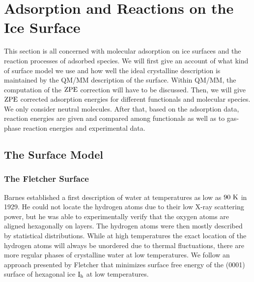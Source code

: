 \section{Adsorption and Reactions on the Ice Surface}
\label{Sec:Ads}

This section is all concerned with molecular adsorption on ice surfaces
and the reaction processes of adsorbed species. We will first give an
account of what kind of surface model we use and how well the ideal
crystalline description is maintained by the QM/MM description of
the surface. Within QM/MM, the computation of the $\text{ZPE}$ correction 
will have to be discussed. Then, we will give $\text{ZPE}$ corrected adsorption
energies for different functionals and molecular species. We only consider
neutral molecules.
After that, based on the adsorption data, reaction energies are given
and compared among functionals as well as to gas-phase reaction
energies and experimental data.

\subsection{The Surface Model}
\label{Sec:Ads:Model}

\subsubsection{The Fletcher Surface}
Barnes established a first description of water at temperatures as low as $90{~\text{K}}$
in 1929.\cite{Barnes1929} He could not locate the hydrogen atoms due
to their low X-ray scattering power,\cite{Fletcher1966} but he was able
to experimentally verify that the oxygen atoms are aligned hexagonally
on layers. The hydrogen atoms were then mostly described by statistical
distributions. While at high temperatures the exact location of the hydrogen
atoms will always be unordered due to thermal fluctuations, there are
more regular phases of crystalline water at low temperatures.
We follow an approach presented by Fletcher that minimizes
surface free energy of the (0001) surface of hexagonal ice $\text I_\text h$ at low
temperatures.\cite{Fletcher1992}

